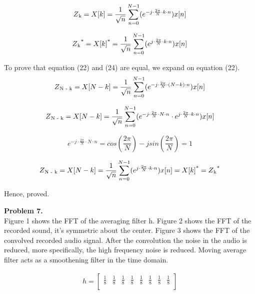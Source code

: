 \documentclass[a4paper]{article}
\begin{document}
\begin{equation}
Z\textsubscript{k} =  X[k] = \frac{1}{\sqrt{n}} \sum_{n=0}^{N-1} ( e^{-j \cdot \frac{2 \pi}{N} \cdot k \cdot n}) x[n]
\end{equation}

\begin{equation}
Z\textsubscript{k}\textsuperscript{*} =  X[k]\textsuperscript{*} = \frac{1}{\sqrt{n}} \sum_{n=0}^{N-1} ( e^{j \cdot \frac{2 \pi}{N} \cdot k \cdot n}) x[n]
\end{equation}

To prove that equation (22) and (24) are equal, we expand on equation (22).\\

\begin{equation}
Z\textsubscript{N - k} =  X[N - k] = \frac{1}{\sqrt{n}} \sum_{n=0}^{N-1} ( e^{-j \cdot \frac{2 \pi}{N} \cdot (N - k) \cdot n}) x[n] 
\end{equation}

\begin{equation}
Z\textsubscript{N - k} =  X[N - k] = \frac{1}{\sqrt{n}} \sum_{n=0}^{N-1} ( e^{-j \cdot \frac{2 \pi}{N} \cdot N \cdot n} \cdot e^{j \cdot \frac{2 \pi}{N} \cdot k \cdot n}) x[n] 
\end{equation}

\begin{equation}
e^{-j \cdot \frac{2 \pi}{N} \cdot N \cdot n} = cos(\frac{2 \pi}{N}) - j sin(\frac{2 \pi}{N}) = 1 
\end{equation}

\begin{equation}
Z\textsubscript{N - k} =  X[N - k] = \frac{1}{\sqrt{n}} \sum_{n=0}^{N-1} ( e^{j \cdot \frac{2 \pi}{N} \cdot k \cdot n}) x[n] =  X[k]\textsuperscript{*} = Z\textsubscript{k}\textsuperscript{*}
\end{equation}

Hence, proved. 

\hfill \newline
\textbf{Problem 7.}\\

Figure 1 shows the FFT of the averaging filter h. Figure 2 shows the FFT of the recorded sound, it's symmetric about the center. Figure 3 shows the FFT of the convolved recorded audio signal. After the convolution the noise in the audio is reduced, more specifically, the high frequency noise is reduced. Moving average filter acts as a smoothening filter in the time domain.

\begin{align}  
h = 
\begin{bmatrix}
   \frac{1}{8} & \frac{1}{8} & \frac{1}{8}  & \frac{1}{8} & \frac{1}{8} & \frac{1}{8} & \frac{1}{8} & \frac{1}{8}\\
 \end{bmatrix}
\end{align}
\end{document}
